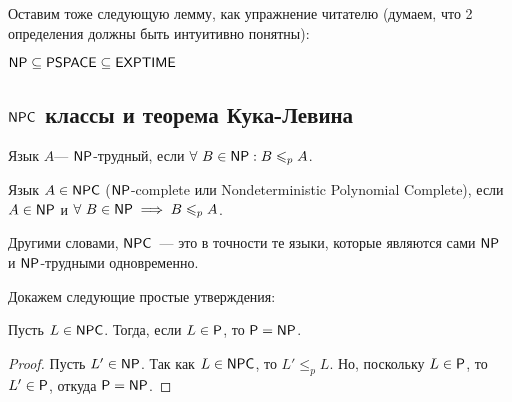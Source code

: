 \documentclass[a4paper, 12pt]{article}
\begin{document}
Оставим тоже следующую лемму, как упражнение читателю (думаем, что 2 определения
должны быть интуитивно понятны):

\begin{Lemma}
  $\mathsf{NP} \subseteq \mathsf{PSPACE} \subseteq \mathsf{EXPTIME}$ 
\end{Lemma}

\subsection{$\mathsf{NPC}$ классы и теорема Кука-Левина}

\begin{Def}
  Язык $A$--- $\mathsf{NP}$-трудный, если $\forall \ B \in \mathsf{NP} : B \leqslant_p A$.
\end{Def}

\begin{Def}
  Язык $A \in \mathsf{NPC}$ ($\mathsf{NP}$-complete или Nondeterministic Polynomial 
  Complete), если $A \in \mathsf{NP}$ и $\forall \ B \in \mathsf{NP} \implies B
  \leqslant_p A$.
\end{Def}

Другими словами, $\mathsf{NPC}$~--- это в точности те языки, которые являются
сами $\mathsf{NP}$ и $\mathsf{NP}$-трудными одновременно.

Докажем следующие простые утверждения:

\begin{Lemma}
  Пусть $L \in \mathsf{NPC}$. Тогда, если $L \in \mathsf{P}$, то $\mathsf{P} = \mathsf{NP}$.
\end{Lemma}
\begin{proof}
  Пусть $L' \in \mathsf{NP}$. Так как $L \in \mathsf{NPC}$, то $L' \leqslant_p L$.
  Но, поскольку $L \in \mathsf{P}$, то $L' \in \mathsf{P}$, откуда $\mathsf{P} = \mathsf{NP}$.
\end{proof}
\end{document}
